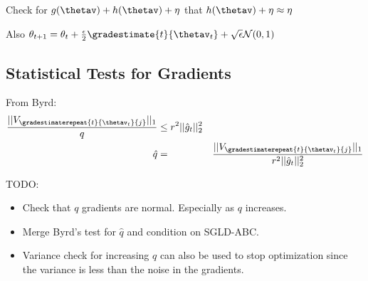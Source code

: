 Check for $g(\thetav) + h(\thetav) + \eta$ that $h(\thetav) + \eta \approx \eta$

Also $\theta_{t+1} = \theta_t + \frac{\epsilon}{2}\gradestimate{t}{\thetav_t} + \sqrt{\epsilon}\mathcal{N}(0,1)$

\subsection{Statistical Tests for Gradients}

From Byrd:
\begin{eqnarray}
\frac{||V_{\gradestimaterepeat{t}{\thetav_t}{j}} ||_1}{q} & \leq r^2 || \hat{g}_t ||_2^2 \\
\hat{q} & = & \frac{||V_{\gradestimaterepeat{t}{\thetav_t}{j}} ||_1}{r^2 || \hat{g}_t ||_2^2}
\end{eqnarray}

TODO:
\begin{itemize}
  \item Check that $q$ gradients are normal.  Especially as $q$ increases.
  \item Merge Byrd's test for $\hat{q}$ and condition on SGLD-ABC.
  \item Variance check for increasing $q$ can also be used to stop optimization since the variance is less than the noise in the gradients.
\end{itemize}

  
